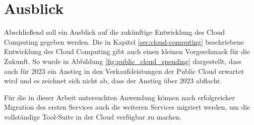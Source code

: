 \chapter{Ausblick}
Abschließend soll ein Ausblick auf die zukünftige Entwicklung des Cloud Computing gegeben werden. Die in Kapitel \ref{sec:cloud-computing} beschriebene Entwicklung des Cloud Computing gibt auch einen kleinen Vorgeschmack für die Zukunft. So wurde in Abbildung \ref{fig:public_cloud_spending} dargestellt, dass auch für 2023 ein Anstieg in den Verkaufsleistungen der Public Cloud erwartet wird und es zeichnet sich nicht ab, dass der Anstieg über 2023 abflacht.

Für die in dieser Arbeit untersuchten Anwendung können nach erfolgreicher Migration des ersten Services auch die weiteren Services migriert werden, um die vollständige Tool-Suite in der Cloud verfügbar zu machen.